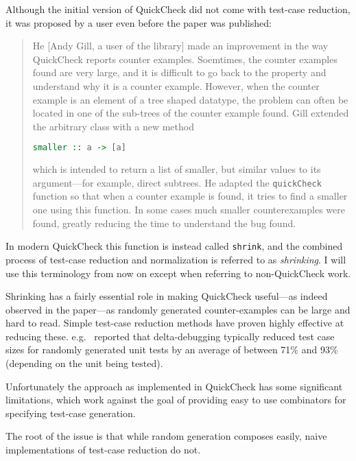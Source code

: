 Although the initial version of QuickCheck did not come with test-case reduction,
it was proposed by a user even before the paper was published:

\begin{quote}
He [Andy Gill, a user of the library] made an improvement in the way QuickCheck reports counter examples.
Soemtimes, the counter examples found are very large,
and it is difficult to go back to the property and understand why it is a counter example.
However,
when the counter example is an element of a tree shaped datatype,
the problem can often be located in one of the sub-trees of the counter example found.
Gill extended the arbitrary class with a new method

\begin{lstlisting}[language=Haskell]
smaller :: a -> [a]
\end{lstlisting}

which is intended to return a list of smaller, but similar values to its argument---for example, direct subtrees.
He adapted the \texttt{quickCheck} function so that when a counter example is found,
it tries to find a smaller one using this function.
In some cases much smaller counterexamples were found,
greatly reducing the time to understand the bug found.
\end{quote}

In modern QuickCheck this function is instead called \texttt{shrink},
and the combined process of test-case reduction and normalization is referred to as \emph{shrinking}.
I will use this terminology from now on except when referring to non-QuickCheck work.

Shrinking has a fairly essential role in making QuickCheck useful---as indeed observed in the paper---as randomly generated counter-examples can be large and hard to read.
Simple test-case reduction methods have proven highly effective at reducing these.
e.g.~ \cite{DBLP:conf/issre/LeiA05} reported that delta-debugging typically reduced test case sizes for randomly generated unit tests by an average of between 71\% and 93\% (depending on the unit being tested). 

Unfortunately the approach as implemented in QuickCheck has some significant limitations,
which work against the goal of providing easy to use combinators for specifying test-case generation.

The root of the issue is that while random generation composes easily,
naive implementations of test-case reduction do not.

